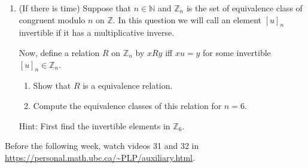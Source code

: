 \documentclass[12pt]{article}
\begin{document}
\begin{enumerate}
\item (If there is time)
Suppose that $n \in \mathbb{N}$ and $\mathbb{Z}_n$ is the set of equivalence class of congruent modulo $n$ on $\mathbb{Z}$. In this question we will call an element $[u]_n$ invertible if it has a multiplicative inverse. 

Now, define a relation $R$ on $\mathbb{Z}_n$ by $xRy$ iff  $xu=y$ for some invertible $[u]_n\in \mathbb{Z}_n$.
\begin{enumerate}
    \item Show that $R$ is a equivalence relation.
    \item Compute the equivalence classes of this relation for $n=6$.
\end{enumerate}

Hint: First find the  invertible elements in $\mathbb Z_6$.



\end{enumerate}

Before the following week, watch videos 31 and 32 in \url{https://personal.math.ubc.ca/~PLP/auxiliary.html}.
\end{document}
